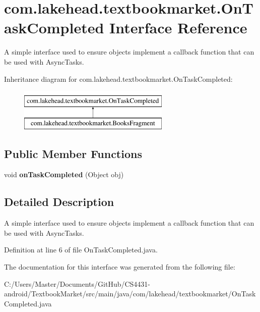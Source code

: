 \hypertarget{interfacecom_1_1lakehead_1_1textbookmarket_1_1_on_task_completed}{\section{com.\-lakehead.\-textbookmarket.\-On\-Task\-Completed Interface Reference}
\label{interfacecom_1_1lakehead_1_1textbookmarket_1_1_on_task_completed}
}


A simple interface used to ensure objects implement a callback function that can be used with Async\-Tasks.  


Inheritance diagram for com.\-lakehead.\-textbookmarket.\-On\-Task\-Completed\-:\begin{figure}[H]
\begin{center}
\leavevmode
\includegraphics[height=2.000000cm]{interfacecom_1_1lakehead_1_1textbookmarket_1_1_on_task_completed}
\end{center}
\end{figure}
\subsection*{Public Member Functions}
\begin{DoxyCompactItemize}
\item 
\hypertarget{interfacecom_1_1lakehead_1_1textbookmarket_1_1_on_task_completed_acd8a2b9261d9caa12331d12941c8b4d3}{void {\bfseries on\-Task\-Completed} (Object obj)}\label{interfacecom_1_1lakehead_1_1textbookmarket_1_1_on_task_completed_acd8a2b9261d9caa12331d12941c8b4d3}

\end{DoxyCompactItemize}


\subsection{Detailed Description}
A simple interface used to ensure objects implement a callback function that can be used with Async\-Tasks. 

Definition at line 6 of file On\-Task\-Completed.\-java.



The documentation for this interface was generated from the following file\-:\begin{DoxyCompactItemize}
\item 
C\-:/\-Users/\-Master/\-Documents/\-Git\-Hub/\-C\-S4431-\/android/\-Textbook\-Market/src/main/java/com/lakehead/textbookmarket/On\-Task\-Completed.\-java\end{DoxyCompactItemize}
